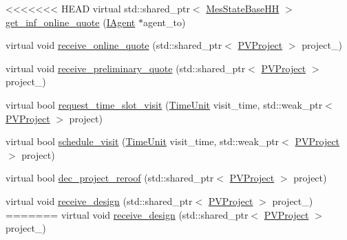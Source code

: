 {\bf }\par
\begin{DoxyCompactItemize}
\item 
<<<<<<< HEAD
virtual std\+::shared\+\_\+ptr$<$ \hyperlink{classsolar__core_1_1_mes_state_base_h_h}{Mes\+State\+Base\+H\+H} $>$ \hyperlink{classsolar__core_1_1_household_a008a18ff8c2d15da72e19876dc896a4e}{get\+\_\+inf\+\_\+online\+\_\+quote} (\hyperlink{classsolar__core_1_1_i_agent}{I\+Agent} $\ast$agent\+\_\+to)
\item 
virtual void \hyperlink{classsolar__core_1_1_household_a306aed410a39e8062ab5f1b4a3216b8b}{receive\+\_\+online\+\_\+quote} (std\+::shared\+\_\+ptr$<$ \hyperlink{classsolar__core_1_1_p_v_project}{P\+V\+Project} $>$ project\+\_\+)
\item 
virtual void \hyperlink{classsolar__core_1_1_household_a31a1c8d006fb9e95a2460aa392eaa830}{receive\+\_\+preliminary\+\_\+quote} (std\+::shared\+\_\+ptr$<$ \hyperlink{classsolar__core_1_1_p_v_project}{P\+V\+Project} $>$ project\+\_\+)
\item 
virtual bool \hyperlink{classsolar__core_1_1_household_a8c9635bac11c9bd93e65dbb5be5b9d85}{request\+\_\+time\+\_\+slot\+\_\+visit} (\hyperlink{namespacesolar__core_a4b5949d07259da6f8a20d12a30403e90}{Time\+Unit} visit\+\_\+time, std\+::weak\+\_\+ptr$<$ \hyperlink{classsolar__core_1_1_p_v_project}{P\+V\+Project} $>$ project)
\item 
virtual bool \hyperlink{classsolar__core_1_1_household_a8d4b9c4a5cf59c93f33489eccbfba7db}{schedule\+\_\+visit} (\hyperlink{namespacesolar__core_a4b5949d07259da6f8a20d12a30403e90}{Time\+Unit} visit\+\_\+time, std\+::weak\+\_\+ptr$<$ \hyperlink{classsolar__core_1_1_p_v_project}{P\+V\+Project} $>$ project)
\item 
virtual bool \hyperlink{classsolar__core_1_1_household_aa63241ca3fcc1f2374d10b5c7f44124a}{dec\+\_\+project\+\_\+reroof} (std\+::shared\+\_\+ptr$<$ \hyperlink{classsolar__core_1_1_p_v_project}{P\+V\+Project} $>$ project)
\end{DoxyCompactItemize}

{\bf }\par
\begin{DoxyCompactItemize}
\item 
virtual void \hyperlink{classsolar__core_1_1_household_a7df346780d3d9683293af565d5831d05}{receive\+\_\+design} (std\+::shared\+\_\+ptr$<$ \hyperlink{classsolar__core_1_1_p_v_project}{P\+V\+Project} $>$ project\+\_\+)
=======
virtual void \hyperlink{classsolar__core_1_1_household_a7df346780d3d9683293af565d5831d05}{receive\+\_\+design} (std\+::shared\+\_\+ptr$<$ \hyperlink{classsolar__core_1_1_p_v_project}{P\+V\+Project} $>$ project\+\_\+)
\end{DoxyCompactItemize}

